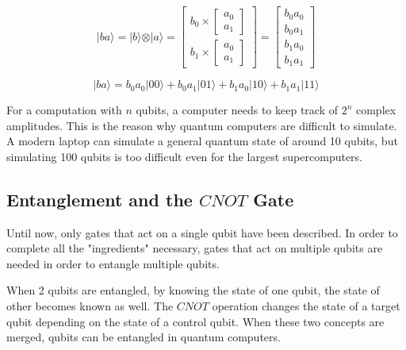 \begin{linenomath}
\begin{equation}
\vert ba \rangle = \vert b \rangle \otimes \vert a \rangle = \begin{bmatrix}
b_0 \times \begin{bmatrix} a_0 \\ a_1 \end{bmatrix} \\
b_1 \times \begin{bmatrix} a_0 \\ a_1 \end{bmatrix}
\end{bmatrix} = \begin{bmatrix} b_0 a_0 \\ b_0 a_1 \\ b_1 a_0 \\ b_1 a_1 \end{bmatrix} 
\label{eq:kron1}
\end{equation}
\end{linenomath}
\begin{linenomath}
\begin{equation}
\vert ba \rangle = b_0a_0\vert 00 \rangle + b_0a_1\vert 01 \rangle + b_1a_0\vert 10 \rangle + b_1a_1\vert 11 \rangle
\label{eq:kron2}
\end{equation}
\end{linenomath}

For a computation with $n$ qubits, a computer needs to keep track of $2^n$
complex amplitudes. This is the reason why quantum computers are difficult to 
simulate. A modern laptop can simulate a general quantum state of around 10 
qubits, but simulating 100 qubits is too difficult even for the largest 
supercomputers.

\subsection{Entanglement and the $CNOT$ Gate}
\label{sec:cnot}

Until now, only gates that act on a single qubit have been described. In order
to complete all the "ingredients" necessary, gates that act on multiple qubits
are needed in order to entangle multiple qubits.

When 2 qubits are entangled, by knowing the state of one qubit, the state of 
other becomes known as well. The $CNOT$ operation changes the state of a target
qubit depending on the state of a control qubit. When these two concepts are 
merged, qubits can be entangled in quantum computers.

